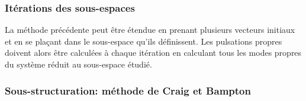 \medskip
\subsubsection{Itérations des sous-espaces}
La méthode précédente peut être étendue en prenant plusieurs vecteurs initiaux et en se plaçant dans
le sous-espace qu'ils définissent. Les pulsations propres doivent alors être calculées à chaque itération
en calculant tous les modes propres du système réduit au sous-espace étudié.

\medskip
\subsubsection{Sous-structuration: méthode de Craig et Bampton}

